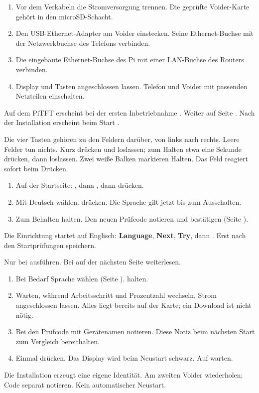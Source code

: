 \begin{enumerate}
\item Vor dem Verkabeln die Stromversorgung trennen. Die geprüfte Voider-Karte gehört in den microSD-Schacht.
\item Den USB-Ethernet-Adapter am Voider einstecken. Seine Ethernet-Buchse mit der Netzwerkbuchse des Telefons verbinden.
\item Die eingebaute Ethernet-Buchse des Pi mit einer LAN-Buchse des Routers verbinden.
\item Display und Tasten angeschlossen lassen. Telefon und Voider mit passenden Netzteilen einschalten.
\end{enumerate}
Auf dem PiTFT erscheint bei der ersten Inbetriebnahme . Weiter auf Seite \pageref{de:install}. Nach der Installation erscheint beim Start .


Die vier Tasten gehören zu den Feldern darüber, von links nach rechts. Leere Felder tun nichts. Kurz drücken und loslassen; zum Halten etwa eine Sekunde drücken, dann loslassen. Zwei weiße Balken markieren Halten. Das Feld reagiert sofort beim Drücken.
\begin{enumerate}
\item Auf der Startseite: , dann , dann  drücken.
\item Mit  Deutsch wählen.  drücken. Die Sprache gilt jetzt bis zum Ausschalten.
\item Zum Behalten  halten. Den neuen Prüfcode notieren und bestätigen (Seite \pageref{de:check}).
\end{enumerate}
Die Einrichtung startet auf Englisch: \textbf{Language}, \textbf{Next}, \textbf{Try}, dann . Erst nach den Startprüfungen speichern.

Nur bei  ausführen. Bei  auf der nächsten Seite weiterlesen.
\begin{enumerate}
\item Bei Bedarf Sprache wählen (Seite \pageref{de:controls}).  halten.
\item Warten, während Arbeitsschritt und Prozentzahl wechseln. Strom angeschlossen lassen. Alles liegt bereits auf der Karte; ein Download ist nicht nötig.
\item Bei  den Prüfcode mit Gerätenamen notieren. Diese Notiz beim nächsten Start zum Vergleich bereithalten.
\item Einmal  drücken. Das Display wird beim Neustart schwarz. Auf  warten.
\end{enumerate}
Die Installation erzeugt eine eigene Identität. Am zweiten Voider wiederholen; Code separat notieren. Kein automatischer Neustart.

